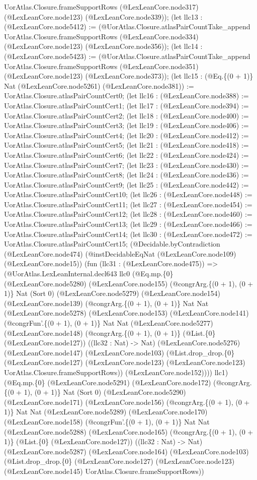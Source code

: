 \documentclass[11pt]{article}
\begin{document}
UorAtlas.Closure.frameSupportRows (@LexLeanCore.node317) (@LexLeanCore.node123) (@LexLeanCore.node339)); (let llc13 : (@LexLeanCore.node5412) := (@UorAtlas.Closure.atlasPairCountTake\_append UorAtlas.Closure.frameSupportRows (@LexLeanCore.node334) (@LexLeanCore.node123) (@LexLeanCore.node356)); (let llc14 : (@LexLeanCore.node5423) := (@UorAtlas.Closure.atlasPairCountTake\_append UorAtlas.Closure.frameSupportRows (@LexLeanCore.node351) (@LexLeanCore.node123) (@LexLeanCore.node373)); (let llc15 : (@Eq.\{(0 + 1)\} Nat (@LexLeanCore.node5261) (@LexLeanCore.node381)) := UorAtlas.Closure.atlasPairCountCert0; (let llc16 : (@LexLeanCore.node388) := UorAtlas.Closure.atlasPairCountCert1; (let llc17 : (@LexLeanCore.node394) := UorAtlas.Closure.atlasPairCountCert2; (let llc18 : (@LexLeanCore.node400) := UorAtlas.Closure.atlasPairCountCert3; (let llc19 : (@LexLeanCore.node406) := UorAtlas.Closure.atlasPairCountCert4; (let llc20 : (@LexLeanCore.node412) := UorAtlas.Closure.atlasPairCountCert5; (let llc21 : (@LexLeanCore.node418) := UorAtlas.Closure.atlasPairCountCert6; (let llc22 : (@LexLeanCore.node424) := UorAtlas.Closure.atlasPairCountCert7; (let llc23 : (@LexLeanCore.node430) := UorAtlas.Closure.atlasPairCountCert8; (let llc24 : (@LexLeanCore.node436) := UorAtlas.Closure.atlasPairCountCert9; (let llc25 : (@LexLeanCore.node442) := UorAtlas.Closure.atlasPairCountCert10; (let llc26 : (@LexLeanCore.node448) := UorAtlas.Closure.atlasPairCountCert11; (let llc27 : (@LexLeanCore.node454) := UorAtlas.Closure.atlasPairCountCert12; (let llc28 : (@LexLeanCore.node460) := UorAtlas.Closure.atlasPairCountCert13; (let llc29 : (@LexLeanCore.node466) := UorAtlas.Closure.atlasPairCountCert14; (let llc30 : (@LexLeanCore.node472) := UorAtlas.Closure.atlasPairCountCert15; (@Decidable.byContradiction (@LexLeanCore.node474) (@instDecidableEqNat (@LexLeanCore.node109) (@LexLeanCore.node15)) (fun (llc31 : (@LexLeanCore.node475)) => (@UorAtlas.LexLeanInternal.decl643 llc0 (@Eq.mp.\{0\} (@LexLeanCore.node5280) (@LexLeanCore.node155) (@congrArg.\{(0 + 1), (0 + 1)\} Nat (Sort 0) (@LexLeanCore.node5279) (@LexLeanCore.node154) (@LexLeanCore.node139) (@congrArg.\{(0 + 1), (0 + 1)\} Nat Nat (@LexLeanCore.node5278) (@LexLeanCore.node153) (@LexLeanCore.node141) (@congrFun'.\{(0 + 1), (0 + 1)\} Nat Nat (@LexLeanCore.node5277) (@LexLeanCore.node148) (@congrArg.\{(0 + 1), (0 + 1)\} (@List.\{0\} (@LexLeanCore.node127)) ((llc32 : Nat) -> Nat) (@LexLeanCore.node5276) (@LexLeanCore.node147) (@LexLeanCore.node103) (@List.drop\_drop.\{0\} (@LexLeanCore.node127) (@LexLeanCore.node123) (@LexLeanCore.node123) UorAtlas.Closure.frameSupportRows)) (@LexLeanCore.node152)))) llc1) (@Eq.mp.\{0\} (@LexLeanCore.node5291) (@LexLeanCore.node172) (@congrArg.\{(0 + 1), (0 + 1)\} Nat (Sort 0) (@LexLeanCore.node5290) (@LexLeanCore.node171) (@LexLeanCore.node156) (@congrArg.\{(0 + 1), (0 + 1)\} Nat Nat (@LexLeanCore.node5289) (@LexLeanCore.node170) (@LexLeanCore.node158) (@congrFun'.\{(0 + 1), (0 + 1)\} Nat Nat (@LexLeanCore.node5288) (@LexLeanCore.node165) (@congrArg.\{(0 + 1), (0 + 1)\} (@List.\{0\} (@LexLeanCore.node127)) ((llc32 : Nat) -> Nat) (@LexLeanCore.node5287) (@LexLeanCore.node164) (@LexLeanCore.node103) (@List.drop\_drop.\{0\} (@LexLeanCore.node127) (@LexLeanCore.node123) (@LexLeanCore.node145) UorAtlas.Closure.frameSupportRows)) 
\end{document}
